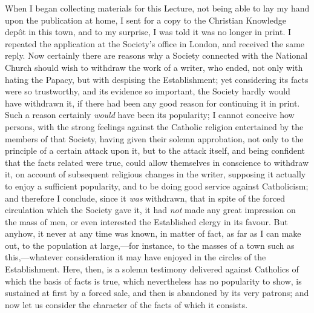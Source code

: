 When I began collecting materials for this Lecture,
not being able to lay my hand upon the publication at
home, I sent for a copy to the Christian Knowledge depôt
in this town, and to my surprise, I was told it was no
longer in print. I repeated the application at the
Society's office in London, and received the same reply.
Now certainly there are reasons why a Society connected
with the National Church should wish to withdraw the work
of a writer, who ended, not only with hating the Papacy,
but with despising the Establishment; yet considering its
facts were so trustworthy, and its evidence so important,
the Society hardly would have withdrawn it, if there had
been any good reason for continuing it in print. Such a
reason certainly \emph{would} have been its popularity;
I cannot conceive how persons, with the strong feelings
against the Catholic religion entertained by the members
of that Society, having given their solemn approbation,
not only to the principle of a certain attack upon it,
but to the attack itself, and being confident that the
facts related were true, could allow themselves in
conscience to withdraw it, on account of subsequent
religious changes in the writer, supposing it actually to
enjoy a sufficient popularity, and to be doing good
service against Catholicism; and therefore I conclude,
since it \emph{was} withdrawn, that in spite of the forced
circulation which the Society gave it, it had \emph{not}
made any great impression on the mass of men, or even
interested the Established clergy in its favour. But
anyhow, it never at any time was known, in matter of
fact, as far as I can make out, to the population at
large,—for instance, to the masses of a town such as
this,—whatever consideration it may have enjoyed in
the circles of the Establishment. Here, then, is a solemn
testimony delivered against Catholics of which the basis
of facts is true, which nevertheless has no popularity to
show, is sustained at first by a forced sale, and then is
abandoned by its very patrons; and now let us consider
the character of the facts of which it consists.

